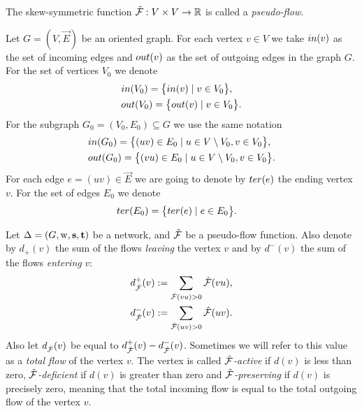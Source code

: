 \documentclass[12pt]{article}
\begin{document}
    \begin{definition}
        The skew-symmetric function $\mathcal{\hat{F}}: V \times V \to \mathbb{R}$ is called a \emph{pseudo-flow}.
    \end{definition}
    \begin{definition}
      Let $G = (V, \vec{E})$ be an oriented graph.
      For each vertex $v \in V$ we take $in(v)$ as the set of incoming edges
      and $out(v)$ as the set of outgoing edges in the graph $G$.
      For the set of vertices $V_0$ we denote
      \begin{align*}
        &in(V_0) = \big\{in(v) \mid v\in V_0\big\},\\
        &out(V_0) = \big\{out(v) \mid v\in V_0\big\}.
      \end{align*}
      For the subgraph $G_0 = (V_0, E_0) \subseteq G$ we use the same notation
      \begin{align*}
        &in(G_0) = \big\{(uv)\in E_0 \mid u \in V \setminus V_0, v \in V_0\big\},\\
        &out(G_0) = \big\{(vu) \in E_0 \mid u \in V\setminus V_0, v \in V_0\big\}.
      \end{align*}
      For each edge $e=(uv) \in \vec{E}$ we are going to denote %
        by $ter(e)$ the ending vertex $v$.
      For the set of edges $E_0$ we denote
      \begin{align*}
        &ter(E_0) = \big\{ter(e) \mid e\in E_0\big\}.
      \end{align*}
    \end{definition}
    \begin{definition}
      Let $\Delta = (G, \mathrm{w}, \mathbf{s}, \mathbf{t})$ be a network, and $\mathcal{\hat{F}}$ be a pseudo-flow function.
      Also denote by $d_{+}(v)$ the sum of the flows \emph{leaving} the vertex $v$ and by
      $d^{-}(v)$ the sum of the flows \emph{entering} $v$:
      \begin{align*}
        &d^{+}_{\mathcal{\hat{F}}}(v) := \sum_{\mathcal{\hat{F}}(vu) > 0} \mathcal{\hat{F}}(vu),\\
        &d^{-}_{\mathcal{\hat{F}}}(v) := \sum_{\mathcal{\hat{F}}(uv) > 0} \mathcal{\hat{F}}(uv).
      \end{align*}
      Also let $d_{\mathcal{\hat{F}}}(v)$ be equal to $d^{+}_{\mathcal{\hat{F}}}(v) - d^{-}_{\mathcal{\hat{F}}}(v)$.
      Sometimes we will refer to this value as a \emph{total flow} of the vertex $v$.
      The vertex is called \emph{$\mathcal{\hat{F}}$-active} if $d(v)$ is less than zero,
      \emph{$\mathcal{\hat{F}}$-deficient} if $d(v)$ is greater than zero and
      \emph{$\mathcal{\hat{F}}$-preserving} if $d(v)$ is precisely zero, meaning that the total incoming flow
      is equal to the total outgoing flow of the vertex $v$.
    \end{definition}
\end{document}
